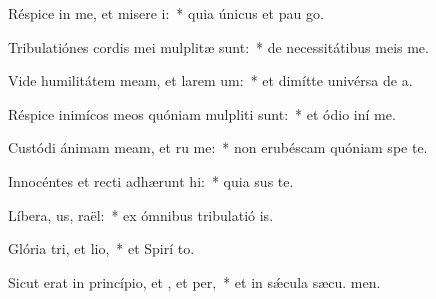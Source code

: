 \item Réspice in me, et misere i:~* quia únicus et pau  go.
\item Tribulatiónes cordis mei mulplitæ sunt:~* de necessitátibus meis  me.
\item Vide humilitátem meam, et larem um:~* et dimítte univérsa de a.
\item Réspice inimícos meos quóniam mulpliti sunt:~* et ódio iní  me.
\item Custódi ánimam meam, et ru me:~* non erubéscam quóniam spe  te.
\item Innocéntes et recti adhærunt hi:~* quia sus te.
\item Líbera, us, raël:~* ex ómnibus tribulatió is.
\item Glória tri, et lio,~* et Spirí to.
\item Sicut erat in princípio, et , et per,~* et in sǽcula sæcu. men.
